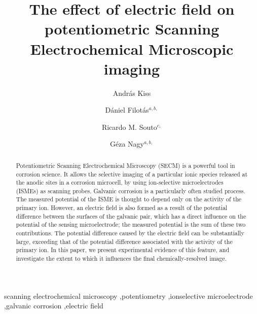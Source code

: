 \documentclass[3p]{elsarticle}
\providecommand{\DIFadd}[1]{{\protect\color{blue}#1}} %
\providecommand{\DIFaddbegin}{} %
\providecommand{\DIFaddend}{} %
\providecommand{\DIFdelbegin}{} %
\providecommand{\DIFdelend}{} %
\begin{document}
\begin{frontmatter}

\title{The effect of electric field on potentiometric Scanning Electrochemical Microscopic imaging}
\DIFaddbegin 

\DIFaddend \author[akiss]{András Kiss\corref{cor}\DIFaddbegin \DIFadd{$^{a,b,}$}\DIFaddend }
\DIFdelbegin %
\DIFdelend {}
\author[dfilotas]{Dániel Filotás\DIFaddbegin \DIFadd{$^{a,b,}$}\DIFaddend }
\author[rmsouto]{Ricardo M. Souto\DIFaddbegin \DIFadd{$^{c,}$}\DIFaddend }
\author[gnagy]{Géza Nagy\DIFaddbegin \DIFadd{$^{a,b,}$}\DIFaddend }

\DIFaddbegin \address[]{Department of General and Physical Chemistry, Faculty of Sciences, University of Pécs, 7624 Pécs, Ifjúság útja 6, Hungary}
\address[]{János Szentágothai Research Centre, University of Pécs, 7624 Pécs, Ifjúság Útja 20, Hungary}
\address[]{Department Chemistry, Universidad de La Laguna, P.O. Box 456, E-38200 La Laguna (Tenerife), Spain}


\DIFaddend \begin{abstract}

Potentiometric Scanning Electrochemical Microscopy (SECM) is a powerful tool in corrosion science.
It allows the selective imaging of a particular ionic species released at the anodic sites in a corrosion microcell, by using ion-selective microelectrodes (ISMEs) as scanning probes. Galvanic corrosion is a particularly often studied process.
The measured potential of the ISME is thought to depend only on the activity of the primary ion.
However, an electric field is also formed as a result of the potential difference between the surfaces of the galvanic pair, which has a direct influence on the potential of the sensing microelectrode; the measured potential is the sum of these two contributions.
The potential difference caused by the electric field can be substantially large, exceeding that of the potential difference associated with the activity of the primary ion.
In this paper, we present experimental evidence of this feature, and investigate the extent to which it influences the final chemically-resolved image. 
\end{abstract}
\begin{keyword}
	scanning electrochemical microscopy \sep potentiometry \sep ionselective microelectrode \sep galvanic corrosion \sep electric field
\end{keyword}
\end{frontmatter}
\end{document}
